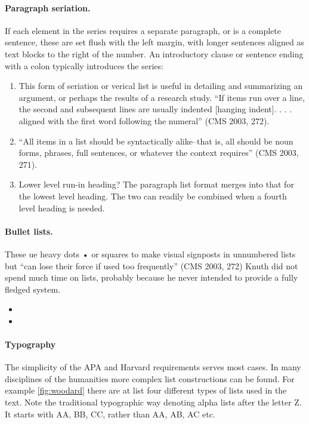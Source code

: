 \paragraph{Paragraph seriation.} If each element in the series requires a separate paragraph, or is a complete
sentence, these are set flush with the left margin, with longer sentences aligned as text blocks to the right
of the number. An introductory clause or sentence ending with a colon typically introduces the series:

      
\begin{enumerate}
\item This form of seriation or verical list is useful in detailing and summarizing an argument, or perhaps the
results of a research study. \enquote{If items run over a line, the second and subsequent lines are usually
indented [hanging indent]. . . . aligned with the first word following the numeral}  (CMS 2003, 272).

\item \enquote{All items in a list should be syntactically alike--that is, all should be noun forms, phrases, full
sentences, or whatever the context requires} (CMS 2003, 271).

\item Lower level run-in heading? The paragraph list format merges into that for the lowest level
heading. The two can readily be combined when a fourth level heading is needed.
\end{enumerate}

\paragraph{Bullet lists.} These ue heavy dots •  or squares to  make visual signposts in unnumbered lists but ``can lose their force
if used too frequently” (CMS 2003, 272)
Knuth did not spend much time on lists, probably because he never intended to
provide a fully fledged system.

\begin{itemize}
\item \lorem
\item \lorem
      \lorem
\end{itemize}

\paragraph{Typography}

The simplicity of the APA and Harvard requirements serves most cases. In many disciplines of the humanities more complex
list constructions can be found. For example \ref{fig:woodard} there are at list four different types of lists used in the text. Note the traditional typographic way denoting alpha lists after the letter Z. It starts with AA, BB, CC, rather than AA, AB, AC etc. 

